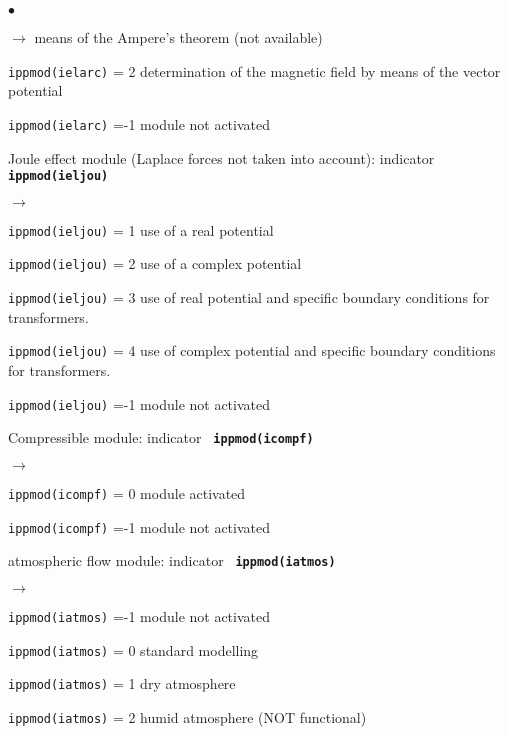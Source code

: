 {{{\begin{list}{$\bullet$}{}
\begin{list}{$\rightarrow$}{}
                     means of the Ampere's theorem (not available)
               \item \texttt{ippmod(ielarc)} = 2 determination of the magnetic
                     field by means of the vector potential
               \item \texttt{ippmod(ielarc)} =-1 module not activated
         \end{list}
       \item Joule effect module (Laplace forces not taken into account):
             indicator {\bf \tt ippmod(ieljou)}
        \begin{list}{$\rightarrow$}{}
               \item \texttt{ippmod(ieljou)} = 1 use of a real potential
               \item \texttt{ippmod(ieljou)} = 2 use of a complex potential
               \item \texttt{ippmod(ieljou)} = 3 use of real potential and specific boundary conditions for transformers.
               \item \texttt{ippmod(ieljou)} = 4 use of complex potential and specific boundary conditions for transformers.
               \item \texttt{ippmod(ieljou)} =-1 module not activated
         \end{list}
       \item Compressible module: indicator {\bf \tt
             ippmod(icompf)}
        \begin{list}{$\rightarrow$}{}
               \item \texttt{ippmod(icompf)} = 0 module activated
               \item \texttt{ippmod(icompf)} =-1 module not activated
         \end{list}
       \item atmospheric flow module: indicator {\bf \tt
             ippmod(iatmos)}
        \begin{list}{$\rightarrow$}{}
               \item \texttt{ippmod(iatmos)} =-1 module not activated
               \item \texttt{ippmod(iatmos)} = 0 standard modelling
               \item \texttt{ippmod(iatmos)} = 1 dry atmosphere
               \item \texttt{ippmod(iatmos)} = 2 humid atmosphere (NOT functional)
         \end{list}

\end{list}}}}
